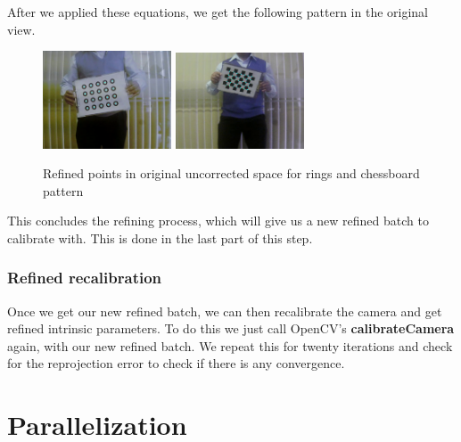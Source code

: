 \documentclass[journal]{IEEEtran}
\begin{document}
\begin{itemize}
        After we applied these equations, we get the following pattern in the original view.

        \begin{figure}[H]
        \centering
        \includegraphics[width=1.5in]{_img/report_4/img_refinement_distortion.png}
        \includegraphics[width=1.5in]{_img/report_4/img_refinement_distortion_chessboard.png}
        \caption{Refined points in original uncorrected space for rings and chessboard pattern}
        \end{figure}

        This concludes the refining process, which will give us a new refined batch to calibrate with. This is done in the last part of this step.

\end{itemize}

\subsubsection{ \textbf{ Refined recalibration } }

Once we get our new refined batch, we can then recalibrate the camera and get refined intrinsic parameters. To do this we just call OpenCV's \textbf{calibrateCamera} again, with our new refined batch. We repeat this for twenty iterations and check for the reprojection error to check if there is any convergence.

\section{Parallelization}
\end{document}
